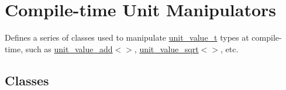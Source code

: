 \hypertarget{group___compile_time_unit_manipulators}{}\section{Compile-\/time Unit Manipulators}
\label{group___compile_time_unit_manipulators}


Defines a series of classes used to manipulate {\ttfamily \hyperlink{structunits_1_1unit__value__t}{unit\+\_\+value\+\_\+t}} types at compile-\/time, such as {\ttfamily \hyperlink{structunits_1_1unit__value__add}{unit\+\_\+value\+\_\+add}$<$$>$}, {\ttfamily \hyperlink{structunits_1_1unit__value__sqrt}{unit\+\_\+value\+\_\+sqrt}$<$$>$}, etc.  


\subsection*{Classes}
